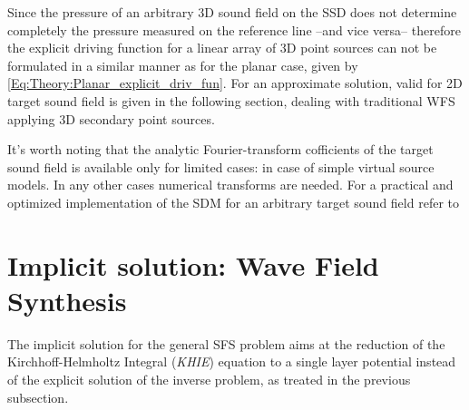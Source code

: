 Since the pressure of an arbitrary 3D sound field on the SSD does not determine completely the pressure measured on the reference line --and vice versa-- therefore the explicit driving function for a linear array of 3D point sources can not be formulated in a similar manner as for the planar case, given by \eqref{Eq:Theory:Planar_explicit_driv_fun}. For an approximate solution, valid for 2D target sound field is given in the following section, dealing with traditional WFS applying 3D secondary point sources.

\vspace{3mm}
It's worth noting that the analytic Fourier-transform cofficients of the target sound field is available only for limited cases: in case of simple virtual source models. In any other cases numerical transforms are needed.
For a practical and optimized implementation of the SDM for an arbitrary target sound field refer to \cite{ahrens2013a:efficientSDM}

%


\newpage

\section{Implicit solution: Wave Field Synthesis}

The implicit solution for the general SFS problem aims at the reduction of the Kirchhoff-Helmholtz Integral (\emph{KHIE}) equation to a single layer potential instead of the explicit solution of the inverse problem, as treated in the previous subsection. 

